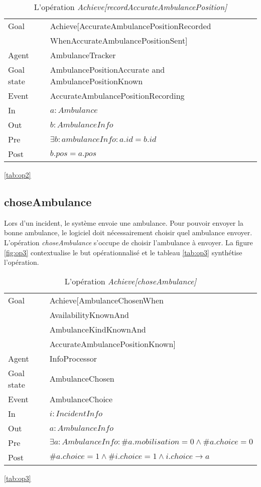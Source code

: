 	\begin{table}[!h] \centering
		\begin{tabularx}{\textwidth}{|l|X|} \hline
			Goal & Achieve[AccurateAmbulancePositionRecorded\\ &WhenAccurateAmbulancePositionSent] \\ \hline
			Agent & AmbulanceTracker \\ \hline
			Goal state & AmbulancePositionAccurate and AmbulancePositionKnown \\ \hline
			Event & AccurateAmbulancePositionRecording \\ \hline
			In & $a: Ambulance$ \\ \hline
			Out & $b: AmbulanceInfo$ \\ \hline
			Pre & $\exists b: ambulanceInfo : a.id = b.id$ \\ \hline
			Post & $b.pos = a.pos$ \\ \hline
		\end{tabularx}
		\caption{L'opération \textit{Achieve[recordAccurateAmbulancePosition]}}\ref{tab:op2}
	\end{table}

\subsection{choseAmbulance}
	
	Lors d'un incident, le système envoie une ambulance. Pour pouvoir envoyer
	la bonne ambulance, le logiciel doit nécessairement choisir quel
	ambulance envoyer. L'opération \textit{choseAmbulance} s'occupe de choisir
	l'ambulance à envoyer. La figure \ref{fig:op3} contextualise le but
	opérationnalisé et le tableau \ref{tab:op3} synthétise l'opération.
	
	
	\begin{table}[!h] \centering
		\begin{tabularx}{\textwidth}{|l|X|} \hline
			Goal & Achieve[AmbulanceChosenWhen\\ & AvailabilityKnownAnd \\ & AmbulanceKindKnownAnd \\ & AccurateAmbulancePositionKnown] \\ \hline
			Agent & InfoProcessor \\ \hline
			Goal state & AmbulanceChosen \\ \hline
			Event & AmbulanceChoice \\ \hline
			In & $i: IncidentInfo$ \\ \hline
			Out & $a: AmbulanceInfo$ \\ \hline
			Pre & $\exists a: AmbulanceInfo : \#a.mobilisation = 0 \wedge \#a.choice = 0$ \\ \hline
			Post & $\#a.choice = 1 \wedge \#i.choice = 1 \wedge i.choice \rightarrow a$ \\ \hline
		\end{tabularx}
		\caption{L'opération \textit{Achieve[choseAmbulance]}}\ref{tab:op3}
	\end{table}

